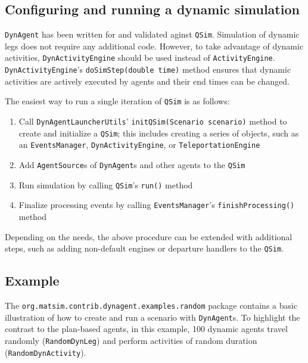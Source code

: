 \subsection{Configuring and running a dynamic simulation}
\label{sec:config-dyn-sim}

\lstinline$DynAgent$ has been written for and validated aginst \lstinline$QSim$. Simulation of dynamic legs does not require any additional code. However, to take advantage of dynamic activities,  \lstinline$DynActivityEngine$ should be used instead of \lstinline$ActivityEngine$. \lstinline$DynActivityEngine$'s \lstinline$doSimStep(double time)$ method ensures that dynamic activities are actively executed by agents and their end times can be changed.

The easiest way to run a single iteration of \lstinline$QSim$ is as follows:
%
\begin{enumerate}

	\item Call \lstinline$DynAgentLauncherUtils$' \lstinline$initQSim(Scenario scenario)$ method to create and initialize a \lstinline$QSim$; this includes creating a series of objects, such as an \lstinline$EventsManager$, \lstinline$DynActivityEngine$, or \lstinline$TeleportationEngine$

	\item Add \lstinline$AgentSource$s of \lstinline$DynAgent$s and other agents to the \lstinline$QSim$
	
	\item Run simulation by calling \lstinline$QSim$'s \lstinline$run()$ method
	
	\item Finalize processing events by calling \lstinline$EventsManager$'s \lstinline$finishProcessing()$ method
	
\end{enumerate}
%
Depending on the needs, the above procedure can be extended with additional steps, such as adding non-default engines or departure handlers to the \lstinline$QSim$.

\subsection{Example}

The \lstinline$org.matsim.contrib.dynagent.examples.random$ package contains a basic illustration of how to create and run a scenario with \lstinline$DynAgent$s. To highlight the contrast to the plan-based agents, in this example, 100 dynamic agents travel randomly (\lstinline$RandomDynLeg$) and perform activities of random duration (\lstinline$RandomDynActivity$).

